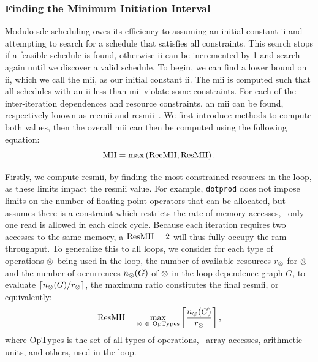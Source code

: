 \subsubsection{Finding the Minimum Initiation Interval}

Modulo \gls{sdc} scheduling owes its efficiency to assuming an initial
constant \gls{ii} and attempting to search for a schedule that satisfies all
constraints.  This search stops if a feasible schedule is found, otherwise
\gls{ii} can be incremented by 1 and search again until we discover a valid
schedule.  To begin, we can find a lower bound on \gls{ii}, which we call the
\gls{mii}, as our initial constant \gls{ii}\@.  The \gls{mii} is computed
such that all schedules with an \gls{ii} less than \gls{mii} violate some
constraints.  For each of the inter-iteration dependences and resource
constraints, an \gls{mii} can be found, respectively known as \gls{recmii} and
\gls{resmii}~\cite{rau94, canis14, zhang13}.  We first introduce methods to
compute both values, then the overall \gls{mii} can then be computed using the
following equation:
\begin{equation}
    \mathrm{MII} = \max\left(\mathrm{RecMII}, \mathrm{ResMII}\right).
\end{equation}

Firstly, we compute \gls{resmii}, by finding the most constrained resources
in the loop, as these limits impact the \gls{resmii} value.  For example,
\verb|dotprod| does not impose limits on the number of floating-point operators
that can be allocated, but assumes there is a constraint which restricts the
rate of memory accesses, \ie~only one read is allowed in each clock cycle.
Because each iteration requires two accesses to the same memory, a $\mathrm{ResMII} =
2$ will thus fully occupy the \gls{ram} throughput.  To generalize this to all
loops, we consider for each type of operations $\otimes$ being used in the
loop, the number of available resources $r_\otimes$ for $\otimes$ and the
number of occurrences $n_\otimes(G)$ of $\otimes$ in the loop dependence
graph $G$, to evaluate $\left\lceil n_\otimes(G) / r_\otimes \right\rceil$,
the maximum ratio constitutes the final \gls{resmii}, or equivalently:
\begin{equation}
    \mathrm{ResMII} = \max_{\otimes~\in~\mathrm{OpTypes}}
        \left\lceil
            \frac{n_\otimes(G)}{r_\otimes}
        \right\rceil,
\end{equation}
where $\mathrm{OpTypes}$ is the set of all types of operations, \eg~array
accesses, arithmetic units, and others, used in the loop.

